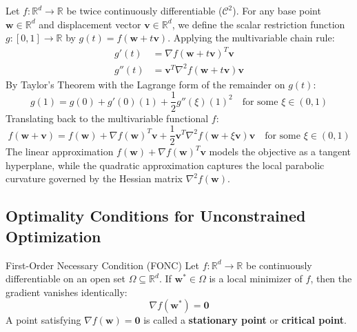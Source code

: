 Let $f: \mathbb{R}^d \to \mathbb{R}$ be twice continuously differentiable ($\mathcal{C}^2$). For any base point $\mathbf{w} \in \mathbb{R}^d$ and displacement vector $\mathbf{v} \in \mathbb{R}^d$, we define the scalar restriction function $g: [0, 1] \to \mathbb{R}$ by $g(t) = f(\mathbf{w} + t\mathbf{v})$. Applying the multivariable chain rule:
\begin{align}
g'(t) &= \nabla f(\mathbf{w} + t\mathbf{v})^T \mathbf{v} \\
g''(t) &= \mathbf{v}^T \nabla^2 f(\mathbf{w} + t\mathbf{v}) \mathbf{v}
\end{align}
By Taylor's Theorem with the Lagrange form of the remainder on $g(t)$:
\begin{equation}
g(1) = g(0) + g'(0)(1) + \frac{1}{2}g''(\xi)(1)^2 \quad \text{for some } \xi \in (0, 1)
\end{equation}
Translating back to the multivariable functional $f$:
\begin{equation}
f(\mathbf{w} + \mathbf{v}) = f(\mathbf{w}) + \nabla f(\mathbf{w})^T \mathbf{v} + \frac{1}{2}\mathbf{v}^T \nabla^2 f(\mathbf{w} + \xi \mathbf{v}) \mathbf{v} \quad \text{for some } \xi \in (0, 1)
\label{eq:taylor_expansion}
\end{equation}
The linear approximation $f(\mathbf{w}) + \nabla f(\mathbf{w})^T \mathbf{v}$ models the objective as a tangent hyperplane, while the quadratic approximation captures the local parabolic curvature governed by the Hessian matrix $\nabla^2 f(\mathbf{w})$.

\subsection{Optimality Conditions for Unconstrained Optimization}

\begin{theorembox}{First-Order Necessary Condition (FONC)}
Let $f: \mathbb{R}^d \to \mathbb{R}$ be continuously differentiable on an open set $\Omega \subseteq \mathbb{R}^d$. If $\mathbf{w}^* \in \Omega$ is a local minimizer of $f$, then the gradient vanishes identically:
\begin{equation}
\nabla f(\mathbf{w}^*) = \mathbf{0}
\label{eq:fonc}
\end{equation}
A point satisfying $\nabla f(\mathbf{w}) = \mathbf{0}$ is called a \textbf{stationary point} or \textbf{critical point}.
\end{theorembox}

